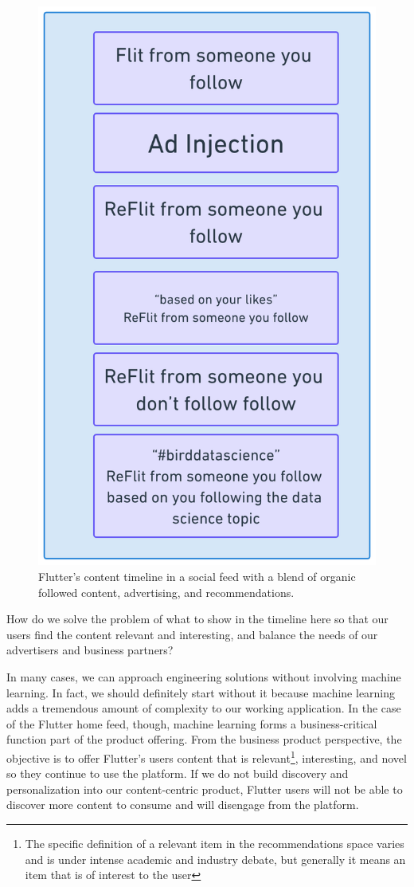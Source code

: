\documentclass[11pt, table]{diazessay} %
\begin{document}
\begin{sloppypar}
\begin{figure}[H]
\centering
\includegraphics[width=.5\textwidth]{figures/timeline.png}
\caption{Flutter's content timeline in a social feed with a blend of organic followed content, advertising, and recommendations.}
\end{figure}

How do we solve the problem of what to show in the timeline here so that our users find the content relevant and interesting, and balance the needs of our advertisers and business partners?

In many cases, we can approach engineering solutions without involving machine learning. In fact, we should definitely start without it\citep{zinkevich2017rules} because machine learning adds a tremendous amount of complexity to our working application\citep{sculley2014machine}. In the case of the Flutter home feed, though, machine learning forms a business-critical function part of the product offering. From the business product perspective, the objective is to offer Flutter’s users content that is relevant\footnote{The specific definition of a relevant item in the recommendations space varies and is under intense academic and industry debate, but generally it means an item that is of interest to the user}, interesting, and novel so they continue to use the platform.  If we do not build discovery and personalization into our content-centric product, Flutter users will not be able to discover more content to consume and will disengage from the platform.


\end{sloppypar}
\end{document}
